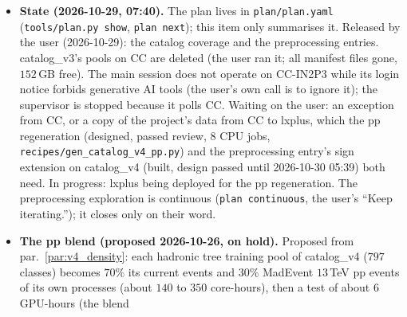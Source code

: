 \documentclass[11pt]{article}
\newcommand{\code}[1]{\texttt{#1}}
\begin{document}
\begin{itemize}
    diagram are out of catalog\_v4's entries ($0$ left), with the $8$ one-loop entries on them as Born and every recipe
    entry, in any role, named after or based on them: $127$ entries ($33$ in the first generation stage, $35$ in the
    training recipe). \emph{The energy hold-out} moves above the training window (the user, 2026-10-26: ``Yes, okay,
    that's fine, go ahead.''): catalog\_v3's $40$ energy probes become \code{v4\_<name>\_\_E20} on $\sqrt{\hat s}\in[6,20]$\,TeV,
    log-uniform like the window, in the fourth generation stage and the held-out recipe
    \code{catalog\_v4\_heldout\_H7E.yaml}; $38$ of them, since two sit on dropped $b$-Higgs trees ($b\bar b\to ggh$,
    $b\bar b\to gggh$). The regeneration is now $1826$ tree entries ($218$M events, about $39$ core-hours) and $142$
    one-loop entries, about $53$\,GB of pools and $66$\,GB with the backends. Next: the regeneration on CC; then
    classes and roles on v4; then the $b$ mass in \code{particle\_ids.py}.
  \item \textbf{State (2026-10-29, 07:40).} The plan lives in \code{plan/plan.yaml} (\code{tools/plan.py show},
    \code{plan next}); this item only summarises it. Released by the user (2026-10-29): the catalog coverage and the
    preprocessing entries. catalog\_v3's pools on CC are deleted (the user ran it; all manifest files gone, $152$\,GB
    free). The main session does not operate on CC-IN2P3 while its login notice forbids generative AI tools (the
    user's own call is to ignore it); the supervisor is stopped because it polls CC. Waiting on the user: an exception
    from CC, or a copy of the project's data from CC to lxplus, which the pp regeneration (designed, passed review,
    $8$ CPU jobs, \code{recipes/gen\_catalog\_v4\_pp.py}) and the preprocessing entry's sign extension on catalog\_v4
    (built, design passed until 2026-10-30 05:39) both need. In progress: lxplus being deployed for the pp
    regeneration. The preprocessing
    exploration is continuous (\code{plan continuous}, the user's ``Keep iterating.''); it closes only on their word.
  \item \textbf{The pp blend (proposed 2026-10-26, on hold).} Proposed from par.~\ref{par:v4_density}: each hadronic
    tree training pool of catalog\_v4 ($797$ classes) becomes $70\%$ its current events and $30\%$ MadEvent $13$\,TeV
    pp events of its own processes (about $140$ to $350$ core-hours), then a test of about $6$ GPU-hours (the blend

\end{itemize}
\end{document}
